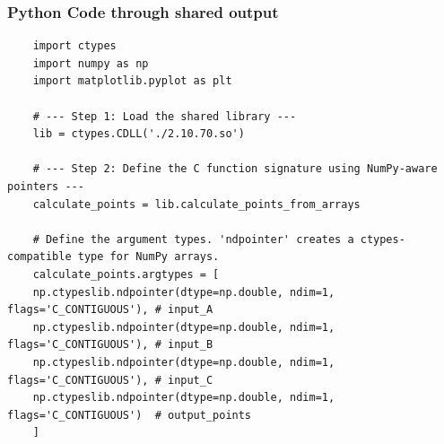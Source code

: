 \documentclass{beamer}
\begin{document}
	\begin{frame}[fragile]
		\frametitle{Python Code through shared output}
		\begin{lstlisting}
	import ctypes
	import numpy as np
	import matplotlib.pyplot as plt
	
	# --- Step 1: Load the shared library ---
	lib = ctypes.CDLL('./2.10.70.so')
	
	# --- Step 2: Define the C function signature using NumPy-aware pointers ---
	calculate_points = lib.calculate_points_from_arrays
	
	# Define the argument types. 'ndpointer' creates a ctypes-compatible type for NumPy arrays.
	calculate_points.argtypes = [
	np.ctypeslib.ndpointer(dtype=np.double, ndim=1, flags='C_CONTIGUOUS'), # input_A
	np.ctypeslib.ndpointer(dtype=np.double, ndim=1, flags='C_CONTIGUOUS'), # input_B
	np.ctypeslib.ndpointer(dtype=np.double, ndim=1, flags='C_CONTIGUOUS'), # input_C
	np.ctypeslib.ndpointer(dtype=np.double, ndim=1, flags='C_CONTIGUOUS')  # output_points
	]
		\end{lstlisting}
	\end{frame}
	
\end{document}
